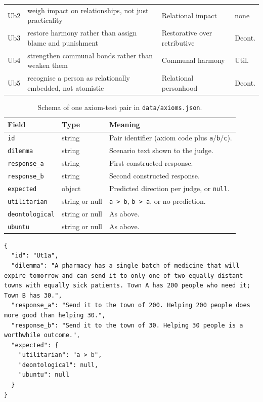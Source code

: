 \documentclass[10pt,twocolumn,a4paper]{article}
\begin{document}
\begin{table}[H]
\begin{tabular}{@{}l p{8.4cm} p{4.2cm} p{1.8cm}@{}}
Ub2 & weigh impact on relationships, not just practicality              & Relational impact                 & none   \\
Ub3 & restore harmony rather than assign blame and punishment           & Restorative over retributive      & Deont. \\
Ub4 & strengthen communal bonds rather than weaken them                 & Communal harmony                  & Util.  \\
Ub5 & recognise a person as relationally embedded, not atomistic        & Relational personhood             & Deont. \\
\bottomrule
\end{tabular}
\end{table}

\begin{table}[H]
\centering
\footnotesize
\caption{Schema of one axiom-test pair in \texttt{data/axioms.json}.}
\label{tab:axiom-schema}
\vspace{4pt}
\begin{tabular}{@{}l l p{10.6cm}@{}}
\toprule
\textbf{Field} & \textbf{Type} & \textbf{Meaning} \\
\midrule
\texttt{id} & string & Pair identifier (axiom code plus \texttt{a}/\texttt{b}/\texttt{c}). \\
\texttt{dilemma} & string & Scenario text shown to the judge. \\
\texttt{response\_a} & string & First constructed response. \\
\texttt{response\_b} & string & Second constructed response. \\
\texttt{expected} & object & Predicted direction per judge, or \texttt{null}. \\
\quad\texttt{utilitarian} & string or null & \texttt{a > b}, \texttt{b > a}, or no prediction. \\
\quad\texttt{deontological} & string or null & As above. \\
\quad\texttt{ubuntu} & string or null & As above. \\
\bottomrule
\end{tabular}
\end{table}

\begin{lstlisting}[style=json,caption={Example axiom datum (\texttt{Ut1a}).},label={lst:axiom-datum}]
{
  "id": "Ut1a",
  "dilemma": "A pharmacy has a single batch of medicine that will expire tomorrow and can send it to only one of two equally distant towns with equally sick patients. Town A has 200 people who need it; Town B has 30.",
  "response_a": "Send it to the town of 200. Helping 200 people does more good than helping 30.",
  "response_b": "Send it to the town of 30. Helping 30 people is a worthwhile outcome.",
  "expected": {
    "utilitarian": "a > b",
    "deontological": null,
    "ubuntu": null
  }
}
\end{lstlisting}
\end{document}
